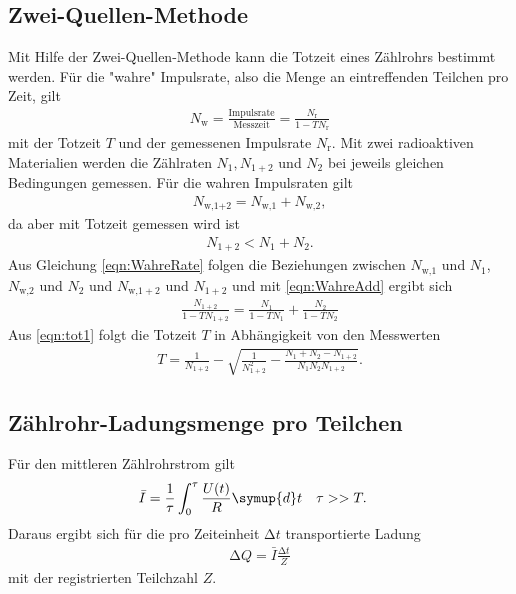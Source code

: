 \subsection{Zwei-Quellen-Methode}

Mit Hilfe der Zwei-Quellen-Methode kann die Totzeit eines Zählrohrs bestimmt
werden.
Für die "wahre" Impulsrate, also die Menge an eintreffenden Teilchen pro
Zeit, gilt
\begin{align}
  N_\text{w} = \frac{\text{Impulsrate}}{\text{Messzeit}} =
  \frac{N_\text{r}}{1-TN_\text{r}}
  \label{eqn:WahreRate}
\end{align}
mit der Totzeit $T$ und der gemessenen Impulsrate $N_\text{r}$.
Mit zwei radioaktiven Materialien werden die Zählraten
$N_1, N_{1+2}$ und $N_2$ bei jeweils gleichen Bedingungen gemessen.
Für die wahren Impulsraten gilt
\begin{align}
  N_\text{{w,}1+2} = N_\text{w,1} + N_\text{w,2},
  \label{eqn:WahreAdd}
\end{align}
da aber mit Totzeit gemessen wird ist
\begin{align}
  N_{1+2} < N_1 + N_2.
\end{align}
Aus Gleichung \eqref{eqn:WahreRate} folgen die Beziehungen zwischen
$N_\text{w,1}$ und $N_1$, $N_\text{w,2}$ und $N_2$ und
$N_{\text{w,}1+2}$ und $N_{1+2}$
und mit \eqref{eqn:WahreAdd} ergibt sich
\begin{align}
  \frac{N_{1+2}}{1-TN_{1+2}} = \frac{N_1}{1-TN_1} + \frac{N_2}{1-TN_2}
  \label{eqn:tot1}
\end{align}
Aus \eqref{eqn:tot1} folgt die Totzeit $T$ in Abhängigkeit von den Messwerten
\begin{align}
  T = \frac{1}{N_{1+2}} - \sqrt{\frac{1}{N_{1+2}^2}-\frac{N_1 + N_2 - N_{1+2}}{N_1 N_2 N_{1+2}}}.
\end{align}

\subsection{Zählrohr-Ladungsmenge pro Teilchen}

Für den mittleren Zählrohrstrom gilt
\begin{align}
  & \bar{I} = \frac{1}{\tau} \int_{0}^{\tau} \frac{U(t)}{R} \symup{d}t & & \tau >> T.
\end{align}
Daraus ergibt sich für die pro Zeiteinheit $\increment t$ transportierte Ladung
\begin{align}
  \increment Q = \bar{I} \frac{\increment t}{Z}
\end{align}
mit der registrierten Teilchzahl $Z$.
